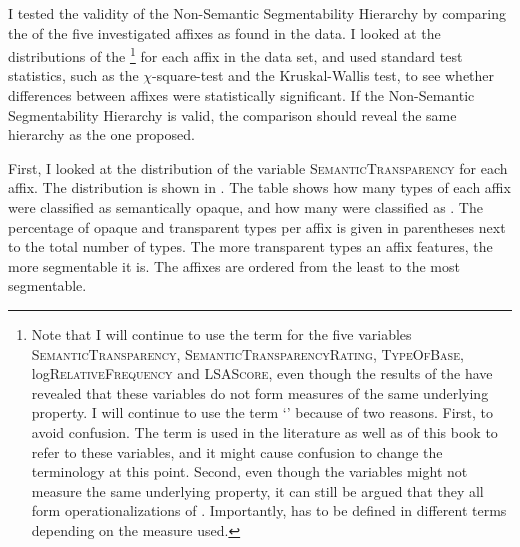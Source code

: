 I tested the validity of the Non-Semantic Segmentability Hierarchy by comparing the  of the five investigated affixes as found in the data. I looked at the distributions of the \footnote{Note that I will continue to use the term  for the five variables \textsc{SemanticTransparency}, \textsc{SemanticTransparencyRating}, \textsc{TypeOfBase}, log\textsc{RelativeFrequency} and \textsc{LSAScore}, even though the results of the  have revealed that these variables do not form measures of the same underlying property. I will continue to use the term `' because of two reasons. First, to avoid confusion. The term is used in the literature as well as  of this book to refer to these variables, and it might cause confusion to change the terminology at this point. Second, even though the variables might not measure the same underlying property, it can still be argued that they all form operationalizations of . Importantly,  has to be defined in different terms depending on the  measure used.} for each affix in the data set, and used standard test statistics, such as the $\chi$-square-test and the Kruskal-Wallis test, to see whether differences between affixes were statistically significant.
If the Non-Semantic Segmentability Hierarchy is valid, the comparison should reveal the same  hierarchy  as the one proposed. 


First, I looked at the distribution of the variable \textsc{SemanticTransparency} for each affix. The distribution is shown in . The table shows how many types of each affix were classified as semantically opaque, and how many were classified as . The percentage of opaque and transparent types per affix is given in parentheses next to the total number of  types. The more transparent types an affix features, the more segmentable it is. The affixes are ordered from the least to the most segmentable.





